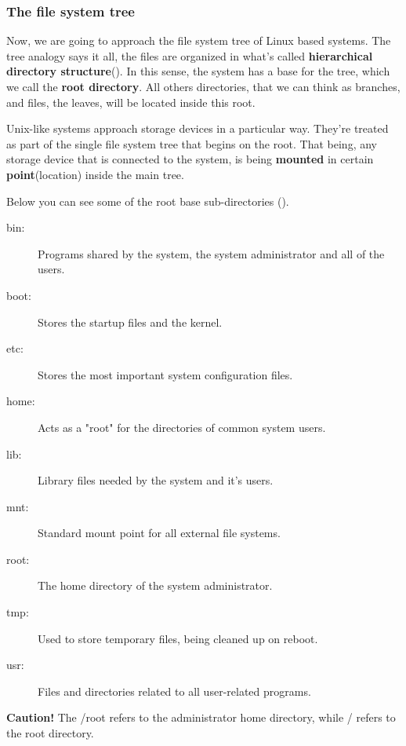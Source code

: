 \documentclass[a4paper,11pt]{article}
\begin{document}
\subsubsection{The file system tree}
Now, we are going to approach the file system tree of Linux based systems. The
tree analogy says it all, the files are organized in what's called
\textbf{hierarchical directory structure}(\cite{shottsLinuxCommandLine2024}). In
this sense, the system has a base for the tree, which we call the \textbf{root
directory}. All others directories, that we can think as branches, and files,
the leaves,  will be located inside this root.
\begin{remarkbox}
    Unix-like systems approach storage devices in a particular way. They're
    treated as part of the single file system tree that begins on the root. That
    being, any storage device that is connected to the system, is being
    \textbf{mounted} in certain \textbf{point}(location) inside the main tree.
\end{remarkbox}
Below you can see some of the root base sub-directories
(\cite{garrelsIntroductionLinux2008}).
\begin{definitionbox}
    \begin{description}
        \item [bin:] Programs shared by the system, the system administrator and
            all of the users.
        \item [boot:] Stores the startup files and the kernel.
        \item [etc:] Stores the most important system configuration files.
        \item [home:] Acts as a "root" for the directories of common system 
            users.
        \item [lib:] Library files needed by the system and it's users.
        \item [mnt:] Standard mount point for all external file systems.
        \item [root:] The home directory of the system administrator.
        \item [tmp:] Used to store temporary files, being cleaned up on reboot.
        \item [usr:] Files and directories related to all user-related programs.
    \end{description}
\end{definitionbox}
\begin{remarkbox}
    \textbf{Caution!} The /root refers to the administrator home directory,
    while / refers to the root directory.
\end{remarkbox}
\end{document}

